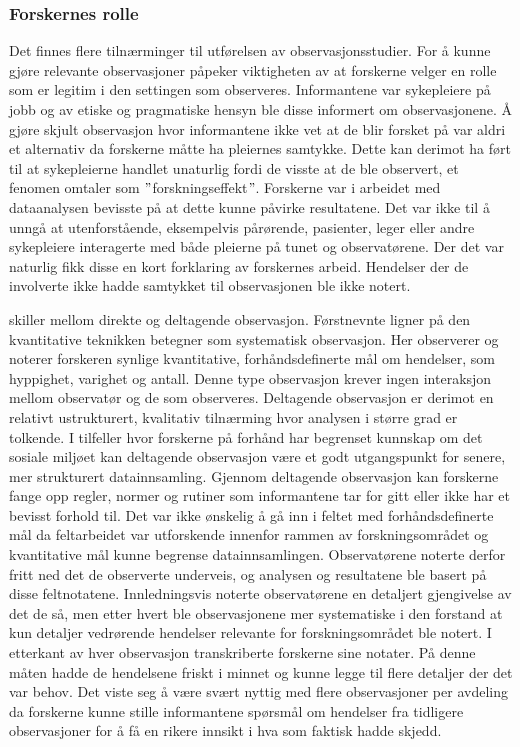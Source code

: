 \subsubsection{Forskernes rolle}
Det finnes flere tilnærminger til utførelsen av observasjonsstudier. For å kunne gjøre relevante observasjoner påpeker \citet{Tjora} viktigheten av at forskerne velger en rolle som er legitim i den settingen som observeres. Informantene var sykepleiere på jobb og av etiske og pragmatiske hensyn ble disse informert om observasjonene. Å gjøre skjult observasjon hvor informantene ikke vet at de blir forsket på var aldri et alternativ da forskerne måtte ha pleiernes samtykke. Dette kan derimot ha ført til at sykepleierne handlet unaturlig fordi de visste at de ble observert, et fenomen \citet{Tjora} omtaler som $"$forskningseffekt$"$. Forskerne var i arbeidet med dataanalysen bevisste på at dette kunne påvirke resultatene. Det var ikke til å unngå at utenforstående, eksempelvis pårørende, pasienter, leger eller andre sykepleiere interagerte med både pleierne på tunet og observatørene. Der det var naturlig fikk disse en kort forklaring av forskernes arbeid. Hendelser der de involverte ikke hadde samtykket til observasjonen ble ikke notert.
 
\noindent
\citet{Greg} skiller mellom direkte og deltagende observasjon. Førstnevnte ligner på den kvantitative teknikken \citet{Oates} betegner som systematisk observasjon. Her observerer og noterer forskeren synlige kvantitative, forhåndsdefinerte mål om hendelser, som hyppighet, varighet og antall. Denne type observasjon krever ingen interaksjon mellom observatør og de som observeres.
Deltagende observasjon er derimot en relativt ustrukturert, kvalitativ tilnærming hvor analysen i større grad er tolkende. I tilfeller hvor forskerne på forhånd har begrenset kunnskap om det sosiale miljøet kan deltagende observasjon være et godt utgangspunkt for senere, mer strukturert datainnsamling. Gjennom deltagende observasjon kan forskerne fange opp regler, normer og rutiner som informantene tar for gitt eller ikke har et bevisst forhold til. Det var ikke ønskelig å gå inn i feltet med forhåndsdefinerte mål da feltarbeidet var utforskende innenfor rammen av forskningsområdet og kvantitative mål kunne begrense datainnsamlingen. Observatørene noterte derfor fritt ned det de observerte underveis, og analysen og resultatene ble basert på disse feltnotatene. Innledningsvis noterte observatørene en detaljert gjengivelse av det de så, men etter hvert ble observasjonene mer systematiske i den forstand at kun detaljer vedrørende hendelser relevante for forskningsområdet ble notert. I etterkant av hver observasjon transkriberte forskerne sine notater. På denne måten hadde de hendelsene friskt i minnet og kunne legge til flere detaljer der det var behov. Det viste seg å være svært nyttig med flere observasjoner per avdeling da forskerne kunne stille informantene spørsmål om hendelser fra tidligere observasjoner for å få en rikere innsikt i hva som faktisk hadde skjedd.
 

